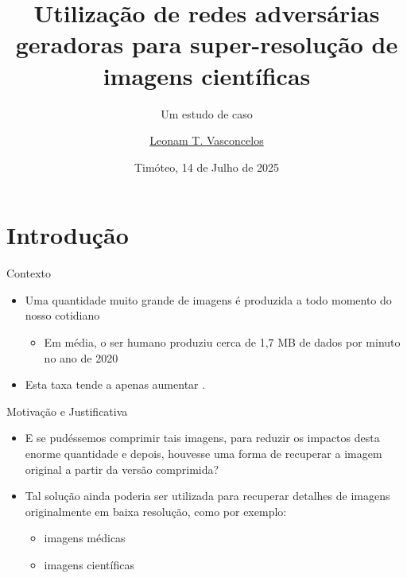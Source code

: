 \documentclass{beamer}
\title{Utilização de redes adversárias geradoras para super-resolução de imagens científicas}
\subtitle{Um estudo de caso}
\author{\href{mailto:leonam.teixeira.vasconcelos@gmail.com}{Leonam T. Vasconcelos}}
\date{Timóteo, 14 de Julho de 2025}
\begin{document}
    \maketitle

    \section{Introdução}


    \begin{frame}{Contexto}{\thesection \, \secname}
        \begin{itemize}
            \item Uma quantidade muito grande de imagens é produzida a todo momento do nosso cotidiano
                
                \begin{itemize}
                    \item Em média, o ser humano produziu cerca de 1,7 MB de dados por minuto no ano de  2020 \cite{vish_how_2020}
                \end{itemize}

            \item Esta taxa tende a apenas aumentar \cite{vish_how_2020}.
        \end{itemize}
    \end{frame}

    \begin{frame}{Motivação e Justificativa}{\thesection \, \secname}
        \begin{itemize}
            \item E se pudéssemos comprimir tais imagens, para reduzir os impactos desta enorme quantidade e depois, houvesse uma forma de recuperar a imagem original a partir da versão comprimida?

            \item Tal solução ainda poderia ser utilizada para recuperar detalhes de imagens originalmente em baixa resolução, como por exemplo:

            \begin{itemize}
                \item imagens médicas

                \item imagens científicas
            \end{itemize}
        \end{itemize}
    \end{frame}
\end{document}
